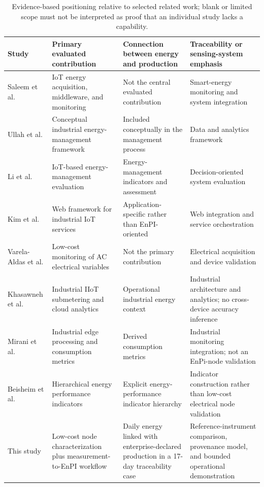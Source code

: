 \documentclass[technologies,article,submit,pdftex,moreauthors]{Definitions/mdpi}
\begin{document}
\begin{table}[!h]
\caption{Evidence-based positioning relative to selected related work; blank or limited scope must not be interpreted as proof that an individual study lacks a capability.}
\label{tab:positioning}
\centering
\small
\begin{tabularx}{\textwidth}{p{}X X X}
\toprule
Study & Primary evaluated contribution & Connection between energy and production & Traceability or sensing-system emphasis \\
\midrule
Saleem et al. \cite{ref1,ref4} & IoT energy acquisition, middleware, and monitoring & Not the central evaluated contribution & Smart-energy monitoring and system integration \\
Ullah et al. \cite{ref2} & Conceptual industrial energy-management framework & Included conceptually in the management process & Data and analytics framework \\
Li et al. \cite{ref3} & IoT-based energy-management evaluation & Energy-management indicators and assessment & Decision-oriented system evaluation \\
Kim et al. \cite{ref5} & Web framework for industrial IoT services & Application-specific rather than EnPI-oriented & Web integration and service orchestration \\
Varela-Aldas et al. \cite{ref24} & Low-cost monitoring of AC electrical variables & Not the primary contribution & Electrical acquisition and device validation \\
Khasawneh et al. \cite{r2_khasawneh2025} & Industrial IIoT submetering and cloud analytics & Operational industrial energy context & Industrial architecture and analytics; no cross-device accuracy inference \\
Mirani et al. \cite{r2_mirani2024} & Industrial edge processing and consumption metrics & Derived consumption metrics & Industrial monitoring integration; not an EnPi-node validation \\
Beisheim et al. \cite{r3_hierarchy2020} & Hierarchical energy performance indicators & Explicit energy-performance indicator hierarchy & Indicator construction rather than low-cost electrical node validation \\
This study & Low-cost node characterization plus measurement-to-EnPI workflow & Daily energy linked with enterprise-declared production in a 17-day traceability case & Reference-instrument comparison, provenance model, and bounded operational demonstration \\
\bottomrule
\end{tabularx}
\end{table}
\end{document}
